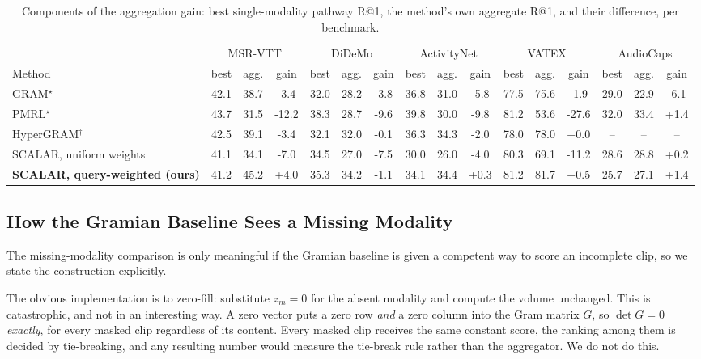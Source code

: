 \documentclass[10pt,twocolumn,letterpaper]{article}
\newcommand{\ours}{SCALAR}
\begin{document}
\begin{table}[t]
\centering
\caption{Components of the aggregation gain: best single-modality pathway R@1,
the method's own aggregate R@1, and their difference, per benchmark.}
\label{tab:gain_components}
\small
\setlength{\tabcolsep}{3pt}
\begin{tabular}{lccccccccccccccc}
\toprule
 & \multicolumn{3}{c}{MSR-VTT} & \multicolumn{3}{c}{DiDeMo} & \multicolumn{3}{c}{ActivityNet} & \multicolumn{3}{c}{VATEX} & \multicolumn{3}{c}{AudioCaps} \\
\cmidrule(lr){2-4}\cmidrule(lr){5-7}\cmidrule(lr){8-10}\cmidrule(lr){11-13}\cmidrule(lr){14-16}
Method & best & agg. & gain & best & agg. & gain & best & agg. & gain & best & agg. & gain & best & agg. & gain \\
\midrule
GRAM$^{\star}$ & 42.1 & 38.7 & -3.4 & 32.0 & 28.2 & -3.8 & 36.8 & 31.0 & -5.8 & 77.5 & 75.6 & -1.9 & 29.0 & 22.9 & -6.1 \\
PMRL$^{\star}$ & 43.7 & 31.5 & -12.2 & 38.3 & 28.7 & -9.6 & 39.8 & 30.0 & -9.8 & 81.2 & 53.6 & -27.6 & 32.0 & 33.4 & +1.4 \\
HyperGRAM$^{\dagger}$ & 42.5 & 39.1 & -3.4 & 32.1 & 32.0 & -0.1 & 36.3 & 34.3 & -2.0 & 78.0 & 78.0 & +0.0 & -- & -- & -- \\
\ours{}, uniform weights & 41.1 & 34.1 & -7.0 & 34.5 & 27.0 & -7.5 & 30.0 & 26.0 & -4.0 & 80.3 & 69.1 & -11.2 & 28.6 & 28.8 & +0.2 \\
\textbf{\ours{}, query-weighted (ours)} & 41.2 & 45.2 & +4.0 & 35.3 & 34.2 & -1.1 & 34.1 & 34.4 & +0.3 & 81.2 & 81.7 & +0.5 & 25.7 & 27.1 & +1.4 \\
\bottomrule
\end{tabular}
\end{table}

\subsection{How the Gramian Baseline Sees a Missing Modality}
\label{sec:maskedvol}

The missing-modality comparison is only meaningful if the Gramian baseline is
given a competent way to score an incomplete clip, so we state the construction
explicitly.

The obvious implementation is to zero-fill: substitute $z_m = 0$ for the absent
modality and compute the volume unchanged. This is catastrophic, and not in an
interesting way. A zero vector puts a zero row \emph{and} a zero column into the
Gram matrix $G$, so $\det G = 0$ \emph{exactly}, for every masked clip
regardless of its content. Every masked clip receives the same constant score,
the ranking among them is decided by tie-breaking, and any resulting number
would measure the tie-break rule rather than the aggregator. We do not do this.
\end{document}

